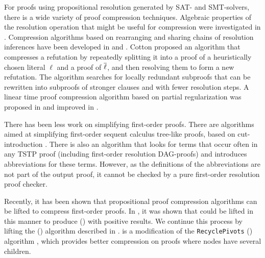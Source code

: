 \documentclass{llncs}
\begin{document}
For proofs using propositional resolution generated by SAT- and SMT-solvers, there is a wide variety of proof compression techniques. Algebraic properties of the resolution operation that might be useful for compression were investigated in \cite{bwp10}.
Compression algorithms based on rearranging and sharing chains of resolution inferences have been
developed in \cite{Amjad07} and \cite{Sinz}.  Cotton \cite{CottonSplit} proposed an algorithm that
compresses a refutation by repeatedly splitting it into a proof of a heuristically chosen literal $\ell$
and a proof of $\overline{\ell}$, and then resolving them to form a new refutation.  The {\ReduceReconstruct} algorithm \cite{RedRec} searches for locally redundant
subproofs that can be rewritten into subproofs of stronger clauses and with fewer resolution steps.
A linear time proof compression algorithm based on partial
regularization was proposed in \cite{RP08} and improved in \cite{LURPI}. %


There has been less work on simplifying first-order proofs. There are algorithms aimed at simplifying first-order sequent calculus tree-like proofs, based on cut-introduction \cite{BrunoLPAR,Hetzl}. There is also an algorithm \cite{LPARCzech} that looks for terms that occur often in any TSTP \cite{TPTP} proof (including first-order resolution DAG-proofs) and introduces abbreviations for these terms. However, as the definitions of the abbreviations are not part of the output proof, it cannot be checked by a pure first-order resolution proof checker.

Recently, it has been shown that propositional proof compression algorithms can be lifted to compress first-order proofs. In \cite{}, it was shown that {\LowerUnits} could be lifted in this manner to produce {\SFOLowerUnits} ({\GFOLU}) with positive results. We continue this process by lifting the \RecyclePivotsIntersection ({\RPI}) algorithm described in \cite{}. {\RPI} is a modification of the \texttt{RecyclePivots} ({\RP}) algorithm \cite{Bar-IlanFuhrmannHooryShachamStrichman2009Linear-time-reductions-of-resolution-proofs}, which  provides better compression on proofs where nodes have several children.
\end{document}
